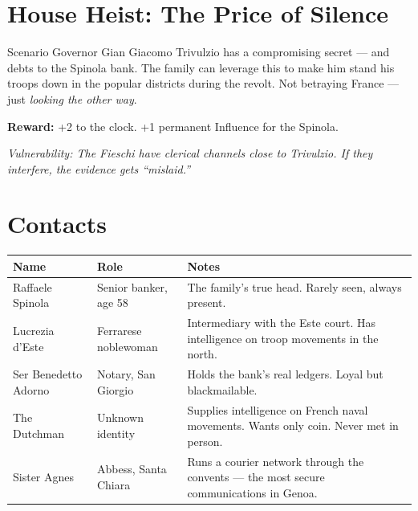 \section{House Heist: The Price of Silence}
\label{sec:spinola-heist}


\begin{rulebox}[SpinolaCrimson]{Scenario}
Governor Gian Giacomo Trivulzio has a compromising secret ---
and debts to the Spinola bank. The family can leverage this to
make him stand his troops down in the popular districts during
the revolt. Not betraying France --- just \textit{looking the other way}.
\end{rulebox}




\textbf{Reward:} +2 to the clock. +1 permanent Influence for the Spinola.

\textit{Vulnerability: The Fieschi have clerical channels close to Trivulzio.
If they interfere, the evidence gets ``mislaid.''}

\section{Contacts}

\begin{center}
\begin{tabularx}{\textwidth}{L{2.8cm} L{2.8cm} X}
  \toprule
  \textbf{Name} & \textbf{Role} & \textbf{Notes} \\
  \midrule
  Raffaele Spinola & Senior banker, age 58  & The family's true head. Rarely seen, always present. \\
  Lucrezia d'Este  & Ferrarese noblewoman   & Intermediary with the Este court. Has intelligence on troop movements in the north. \\
  Ser Benedetto Adorno & Notary, San Giorgio & Holds the bank's real ledgers. Loyal but blackmailable. \\
  The Dutchman     & Unknown identity       & Supplies intelligence on French naval movements. Wants only coin. Never met in person. \\
  Sister Agnes     & Abbess, Santa Chiara   & Runs a courier network through the convents --- the most secure communications in Genoa. \\
  \bottomrule
\end{tabularx}
\end{center}

